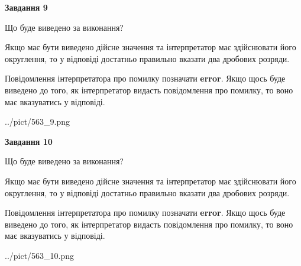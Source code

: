 \documentclass[12pt, ukrainian]{article}
\begin{document}
{\begin {Large}
{\begin {center}\textbf{Завдання 9}\end {center}}\par
Що буде виведено за виконання? \par

Якщо має бути виведено дійсне значення та інтерпретатор має здійснювати його округлення, 
то у відповіді достатньо правильно вказати два дробових розряди.

Повідомлення інтерпретатора про помилку позначати \textbf{error}.
Якщо щось буде виведено до того, як інтерпретатор видасть повідомлення про помилку, 
то воно має вказуватись у відповіді. \par

\begin{center}
	{../pict/563_9.png}
\end{center}
\newpage

{\begin {center}\textbf{Завдання 10}\end {center}}\par
Що буде виведено за виконання? \par

Якщо має бути виведено дійсне значення та інтерпретатор має здійснювати його округлення, 
то у відповіді достатньо правильно вказати два дробових розряди.

Повідомлення інтерпретатора про помилку позначати \textbf{error}.
Якщо щось буде виведено до того, як інтерпретатор видасть повідомлення про помилку, 
то воно має вказуватись у відповіді. \par

\begin{center}
	{../pict/563_10.png}
\end{center}
\newpage

\end {Large}}
\end{document}
